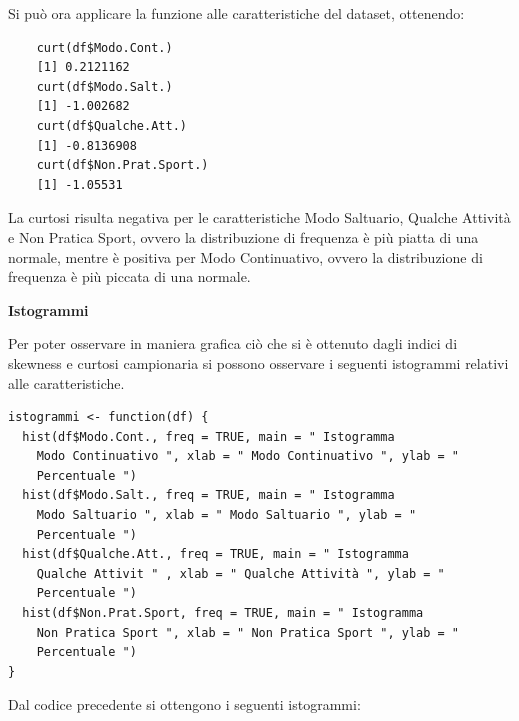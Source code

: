 Si può ora applicare la funzione alle caratteristiche del dataset, ottenendo:

\vspace{5mm}
\begin{lstlisting}
    curt(df$Modo.Cont.)
    [1] 0.2121162
    curt(df$Modo.Salt.)
    [1] -1.002682
    curt(df$Qualche.Att.)
    [1] -0.8136908
    curt(df$Non.Prat.Sport.)
    [1] -1.05531
\end{lstlisting}
\vspace{5mm}

La curtosi risulta negativa per le caratteristiche Modo Saltuario, Qualche Attività e Non Pratica Sport, ovvero la distribuzione di frequenza è più piatta di una normale, mentre è positiva per Modo Continuativo, ovvero la distribuzione di frequenza è più piccata di una normale.

\vspace{5mm}
\noindent \textbf{Istogrammi}

Per poter osservare in maniera grafica ciò che si è ottenuto dagli indici di skewness e curtosi campionaria si possono osservare i seguenti istogrammi relativi alle caratteristiche.

\vspace{5mm}
\begin{lstlisting}
istogrammi <- function(df) {
  hist(df$Modo.Cont., freq = TRUE, main = " Istogramma
    Modo Continuativo ", xlab = " Modo Continuativo ", ylab = "
    Percentuale ")
  hist(df$Modo.Salt., freq = TRUE, main = " Istogramma
    Modo Saltuario ", xlab = " Modo Saltuario ", ylab = "
    Percentuale ")
  hist(df$Qualche.Att., freq = TRUE, main = " Istogramma
    Qualche Attivit " , xlab = " Qualche Attività ", ylab = "
    Percentuale ")
  hist(df$Non.Prat.Sport, freq = TRUE, main = " Istogramma
    Non Pratica Sport ", xlab = " Non Pratica Sport ", ylab = "
    Percentuale ")
}
\end{lstlisting}
\vspace{5mm}

Dal codice precedente si ottengono i seguenti istogrammi:

